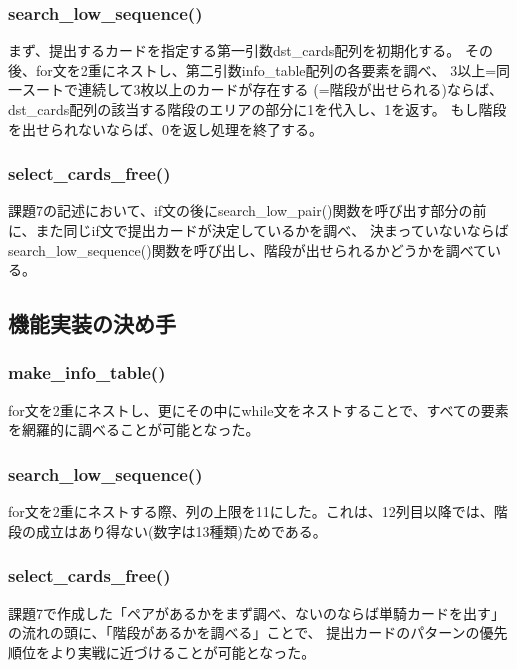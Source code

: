 \documentclass[11pt,a4paper, uplatex]{jsarticle}
\begin{document}
\subsubsection{search_low_sequence()}
まず、提出するカードを指定する第一引数dst_cards配列を初期化する。
その後、for文を2重にネストし、第二引数info_table配列の各要素を調べ、
3以上=同一スートで連続して3枚以上のカードが存在する (=階段が出せられる)ならば、dst_cards配列の該当する階段のエリアの部分に1を代入し、1を返す。
もし階段を出せられないならば、0を返し処理を終了する。
\subsubsection{select_cards_free()}
課題7の記述において、if文の後にsearch_low_pair()関数を呼び出す部分の前に、また同じif文で提出カードが決定しているかを調べ、
決まっていないならばsearch_low_sequence()関数を呼び出し、階段が出せられるかどうかを調べている。
\subsection{機能実装の決め手}
\subsubsection{make_info_table()}
for文を2重にネストし、更にその中にwhile文をネストすることで、すべての要素を網羅的に調べることが可能となった。
\subsubsection{search_low_sequence()}
for文を2重にネストする際、列の上限を11にした。これは、12列目以降では、階段の成立はあり得ない(数字は13種類)ためである。
\subsubsection{select_cards_free()}
課題7で作成した「ペアがあるかをまず調べ、ないのならば単騎カードを出す」の流れの頭に、「階段があるかを調べる」ことで、
提出カードのパターンの優先順位をより実戦に近づけることが可能となった。
%
%
\end{document}
